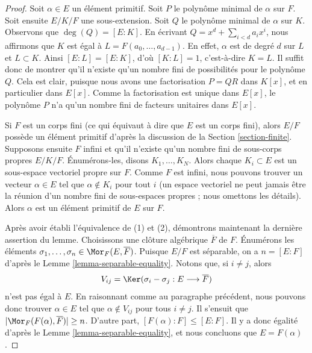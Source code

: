 \begin{proof}
Soit $\alpha \in E$ un élément primitif. Soit $P$ le polynôme minimal
de $\alpha$ sur $F$. Soit ensuite $E/K/F$ une sous-extension.
Soit $Q$ le polynôme minimal de $\alpha$ sur $K$. Observons que
$\deg(Q) = [E : K]$. En écrivant $Q = x^d + \sum_{i < d} a_i x^i$, nous affirmons que
$K$ est égal à $L = F(a_0, \ldots, a_{d - 1})$. En effet, $\alpha$ est de degré
$d$ sur $L$ et $L \subset K$. Ainsi $[E : L] = [E : K]$, d'où
$[K : L] = 1$, c'est-à-dire $K = L$.
Il suffit donc de montrer qu'il n'existe qu'un nombre fini de possibilités
pour le polynôme $Q$. Cela est clair, puisque nous avons une factorisation
$P = QR$  dans $K[x]$, et en particulier dans $E[x]$. Comme la factorisation
est unique dans $E[x]$, le polynôme $P$ n'a qu'un nombre fini de facteurs
unitaires dans $E[x]$.

\medskip\noindent
Si $F$ est un corps fini (ce qui équivaut à dire que $E$ est un corps fini), alors
$E/F$ possède un élément primitif d'après la discussion de la
Section \ref{section-finite}.
Supposons ensuite $F$ infini et qu'il n'existe qu'un nombre fini de sous-corps
propres $E/K/F$. Énumérons-les, disons $K_1, \ldots, K_N$. Alors
chaque $K_i \subset E$ est un sous-espace vectoriel propre sur $F$. Comme $F$ est infini,
nous pouvons trouver un vecteur $\alpha \in E$ tel que $\alpha \not \in K_i$ pour tout $i$
(un espace vectoriel ne peut jamais être la réunion d'un nombre fini de sous-espaces propres ;
nous omettons les détails). Alors $\alpha$ est un élément primitif de $E$ sur $F$.

\medskip\noindent
Après avoir établi l'équivalence de (1) et (2), démontrons maintenant
la dernière assertion du lemme. Choisissons une clôture algébrique
$\overline{F}$ de $F$. Énumérons les éléments
$\sigma_1, \ldots, \sigma_n \in \Mor_F(E, \overline{F})$.
Puisque $E/F$ est séparable, on a $n = [E : F]$ d'après le
Lemme \ref{lemma-separable-equality}.
Notons que, si $i \not = j$, alors
$$
V_{ij} = \Ker(\sigma_i - \sigma_j : E \longrightarrow \overline{F})
$$
n'est pas égal à $E$. En raisonnant comme au paragraphe précédent,
nous pouvons donc trouver $\alpha \in E$ tel que $\alpha \not \in V_{ij}$ pour tous
$i \not = j$. Il s'ensuit que $|\Mor_F(F(\alpha), \overline{F})| \geq n$.
D'autre part, $[F(\alpha) : F] \leq [E : F]$. Il y a donc égalité
d'après le Lemme \ref{lemma-separable-equality},
et nous concluons que $E = F(\alpha)$.
\end{proof}







